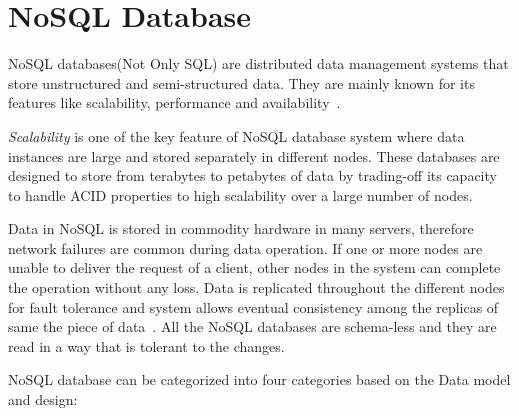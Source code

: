 	\section{NoSQL Database}
	NoSQL databases(Not Only SQL) are distributed data management systems that store unstructured and semi-structured data. They are mainly known for its features like scalability, performance and availability~\citep{hecht2011nosql}.
	
	\textit{Scalability} is one of the key feature of NoSQL database system  where data instances are large and stored separately in different nodes. These databases are designed to store from terabytes to petabytes of data by trading-off its capacity to handle ACID properties to high scalability over a large number of nodes\cite{abramova2013nosql}. 	
   \par  Data in NoSQL is stored in commodity hardware in many servers, therefore network failures are common during data operation. If one or more nodes are unable to deliver the request of a client,  other nodes in the system can complete the operation without any loss. Data is replicated throughout the different nodes for fault tolerance and system allows eventual consistency among the replicas of same the piece of data~\cite{nosql/comparision}. All the NoSQL databases are schema-less and they are read in a way that is tolerant to the changes.  
    \par NoSQL database can be categorized into four categories based on the Data model and design:
